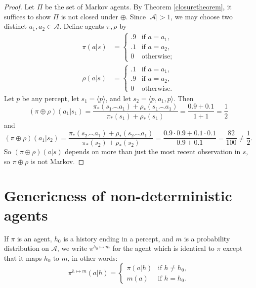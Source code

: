 \documentclass[runningheads]{llncs}
\begin{document}
\begin{proof}
    Let $\Pi$ be the set of Markov agents.
    By Theorem \ref{closuretheorem}, it suffices to show $\Pi$ is not
    closed under $\oplus$.
    Since $|\mathcal A|>1$, we may choose two distinct $a_1,a_2\in\mathcal A$.
    Define agents $\pi,\rho$ by
    \begin{align*}
        \pi(a|s)
        &=
        \begin{cases}
            .9 & \mbox{if $a=a_1$,}\\
            .1 & \mbox{if $a=a_2$,}\\
            0 & \mbox{otherwise;}
        \end{cases}\\
        \rho(a|s)
        &=
        \begin{cases}
            .1 & \mbox{if $a=a_1$,}\\
            .9 & \mbox{if $a=a_2$,}\\
            0 & \mbox{otherwise.}
        \end{cases}
    \end{align*}
    Let $p$ be any percept,
    let $s_1=\langle p\rangle$, and let $s_2=\langle p,a_1,p\rangle$.
    Then
    \[
        (\pi\oplus\rho)(a_1|s_1)
        = \frac{\pi_*(s_1\frown a_1) + \rho_*(s_1\frown a_1)}{\pi_*(s_1)+\rho_*(s_1)}
        = \frac{0.9 + 0.1}{1+1} = \frac12
    \]
    and
    \[
        (\pi\oplus\rho)(a_1|s_2)
        = \frac{\pi_*(s_2\frown a_1) + \rho_*(s_2\frown a_1)}{\pi_*(s_2)+\rho_*(s_2)}
        = \frac{0.9\cdot 0.9 + 0.1\cdot 0.1}{0.9+0.1}=\frac{82}{100}\not=\frac12.
    \]
    So $(\pi\oplus\rho)(a|s)$ depends on more than just the most recent
    observation in $s$, so $\pi\oplus\rho$ is not Markov.
\end{proof}


\section{Genericness of non-deterministic agents}

\begin{definition}
\label{modifyagentatoneplace}
    If $\pi$ is an agent, $h_0$ is a history ending in a percept,
    and $m$ is a probability distribution on $\mathcal A$,
    we write $\pi^{h_0\mapsto m}$ for the agent which is identical to $\pi$
    except that it maps $h_0$ to $m$, in other words:
    \[
        \pi^{h\mapsto m}(a|h)
        =
        \begin{cases}
            \pi(a|h) &\mbox{if $h\not=h_0$,}\\
            m(a) &\mbox{if $h=h_0$.}
        \end{cases}
    \]
\end{definition}
\end{document}
